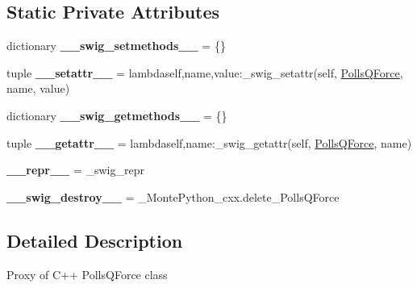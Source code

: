 \subsection*{Static Private Attributes}
\begin{DoxyCompactItemize}
\item 
\hypertarget{classMontePython__cxx_1_1PollsQForce_aa1c795965249a1160b5a02d30ab58594}{}dictionary {\bfseries \+\_\+\+\_\+swig\+\_\+setmethods\+\_\+\+\_\+} = \{\}\label{classMontePython__cxx_1_1PollsQForce_aa1c795965249a1160b5a02d30ab58594}

\item 
\hypertarget{classMontePython__cxx_1_1PollsQForce_a68b2ff8107bbd6c83325f5d7f50c3cf0}{}tuple {\bfseries \+\_\+\+\_\+setattr\+\_\+\+\_\+} = lambdaself,name,value\+:\+\_\+swig\+\_\+setattr(self, \hyperlink{classMontePython__cxx_1_1PollsQForce}{Polls\+Q\+Force}, name, value)\label{classMontePython__cxx_1_1PollsQForce_a68b2ff8107bbd6c83325f5d7f50c3cf0}

\item 
\hypertarget{classMontePython__cxx_1_1PollsQForce_a6072915cd87dabc8a0a3d0ccdff38585}{}dictionary {\bfseries \+\_\+\+\_\+swig\+\_\+getmethods\+\_\+\+\_\+} = \{\}\label{classMontePython__cxx_1_1PollsQForce_a6072915cd87dabc8a0a3d0ccdff38585}

\item 
\hypertarget{classMontePython__cxx_1_1PollsQForce_a7876b01467238ac2942155a400a6cea6}{}tuple {\bfseries \+\_\+\+\_\+getattr\+\_\+\+\_\+} = lambdaself,name\+:\+\_\+swig\+\_\+getattr(self, \hyperlink{classMontePython__cxx_1_1PollsQForce}{Polls\+Q\+Force}, name)\label{classMontePython__cxx_1_1PollsQForce_a7876b01467238ac2942155a400a6cea6}

\item 
\hypertarget{classMontePython__cxx_1_1PollsQForce_a52d68dea065f5a581bd33e61b369c776}{}{\bfseries \+\_\+\+\_\+repr\+\_\+\+\_\+} = \+\_\+swig\+\_\+repr\label{classMontePython__cxx_1_1PollsQForce_a52d68dea065f5a581bd33e61b369c776}

\item 
\hypertarget{classMontePython__cxx_1_1PollsQForce_aad3eea9d95821a30a6b342febdc66e3f}{}{\bfseries \+\_\+\+\_\+swig\+\_\+destroy\+\_\+\+\_\+} = \+\_\+\+Monte\+Python\+\_\+cxx.\+delete\+\_\+\+Polls\+Q\+Force\label{classMontePython__cxx_1_1PollsQForce_aad3eea9d95821a30a6b342febdc66e3f}

\end{DoxyCompactItemize}


\subsection{Detailed Description}
\begin{DoxyVerb}Proxy of C++ PollsQForce class\end{DoxyVerb}
 

